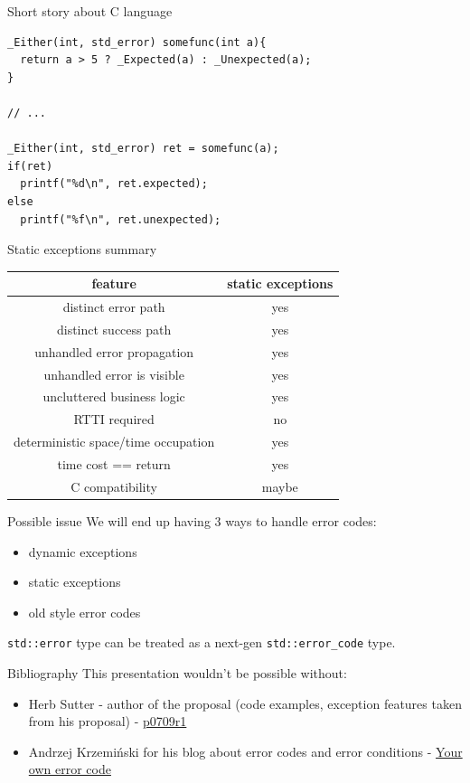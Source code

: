 \documentclass[10pt]{beamer}
\begin{document}
\begin{frame}[fragile]{Short story about C language}
	\begin{verbatim}
_Either(int, std_error) somefunc(int a){
  return a > 5 ? _Expected(a) : _Unexpected(a);
}

// ...

_Either(int, std_error) ret = somefunc(a);
if(ret)
  printf("%d\n", ret.expected);
else
  printf("%f\n", ret.unexpected);
	\end{verbatim}
\end{frame}

\begin{frame}{Static exceptions summary}
\centering
	\begin{tabular}{|c|c|}
		\hline
		feature & static exceptions \\ \hline \hline
		distinct error path & yes \\ \hline
		distinct success path & yes \\ \hline \hline
		unhandled error propagation & yes \\ \hline
		unhandled error is visible & yes \\ \hline
		uncluttered business logic & yes \\ \hline \hline
		RTTI required & no \\ \hline
		deterministic space/time occupation & yes \\ \hline
		time cost == return & yes \\ \hline \hline
		C compatibility & maybe \\ \hline
	\end{tabular}
\end{frame}

\begin{frame}{Possible issue}
	We will end up having 3 ways to handle error codes:
	\begin{itemize}
		\item dynamic exceptions
		\item static exceptions
		\item old style error codes
	\end{itemize}

	\vfill

	\texttt{std::error} type can be treated as a next-gen \texttt{std::error\_code} type.
\end{frame}

\begin{frame}{Bibliography}
	This presentation wouldn't be possible without:
	
	\begin{itemize}
		\item Herb Sutter - author of the proposal (code examples, exception features taken from his proposal) -  \href{http://www.open-std.org/jtc1/sc22/wg21/docs/papers/2018/p0709r1.pdf}{p0709r1}
		
		\item Andrzej Krzemiński for his blog about error codes and error conditions -  \href{https://akrzemi1.wordpress.com/2017/07/12/your-own-error-code/}{Your own error code}
	\end{itemize}
\end{frame}
\end{document}
